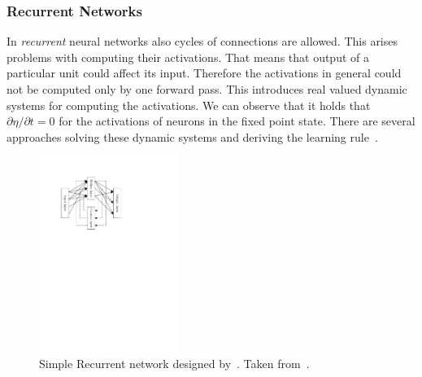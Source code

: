 \subsubsection{Recurrent Networks}
\label{sec:theory-recurrent} 

In \emph{recurrent} neural networks also cycles of connections are allowed. This arises problems with computing their activations. That means that output of a particular unit could affect its input. Therefore the activations in general could not be computed only by one forward pass. This introduces real valued dynamic systems for computing the activations. We can observe that it holds that $\partial\eta / \partial t = 0$ for the activations of neurons in the fixed point state. There are several approaches solving these dynamic systems and deriving the learning rule~\citep{pineda1987generalization, pearlmutter1989learning, williams1989learning, elman1990finding, haykin1994neural}. 

\begin{figure}[H]
  \centering
  \includegraphics[width=0.4\textwidth]{img/models-recurrent.pdf}    
  \caption{Simple Recurrent network designed by~\citet{elman1990finding}. Taken from~\citet{haykin1994neural}.} 
  \label{fig:theory-recurrent}
\end{figure}

